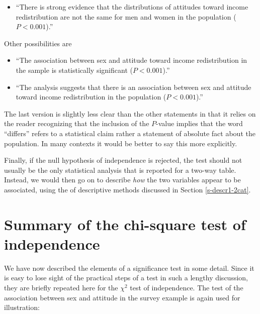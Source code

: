 \documentclass[11pt,a4paper,openany]{book}
\providecommand{\tightlist}{%
  \setlength{\itemsep}{0pt}\setlength{\parskip}{0pt}}
\begin{document}
\begin{itemize}
  \begin{itemize}
  \tightlist
  \item
    ``There is strong evidence that the distributions of attitudes
    toward income redistribution are not the same for men and women in
    the population (\(P<0.001\)).''
  \end{itemize}

  Other possibilities are

  \begin{itemize}
  \item
    ``The association between sex and attitude toward income
    redistribution in the sample is statistically significant
    (\(P<0.001\)).''
  \item
    ``The analysis suggests that there is an association between sex and
    attitude toward income redistribution in the population
    (\(P<0.001\)).''
  \end{itemize}

  The last version is slightly less clear than the other statements in
  that it relies on the reader recognizing that the inclusion of the
  \(P\)-value implies that the word ``differs'' refers to a statistical
  claim rather a statement of absolute fact about the population. In
  many contexts it would be better to say this more explicitly.
\end{itemize}

Finally, if the null hypothesis of independence is rejected, the test
should not usually be the only statistical analysis that is reported for
a two-way table. Instead, we would then go on to describe \emph{how} the
two variables appear to be associated, using the of descriptive methods
discussed in Section \ref{s-descr1-2cat}.

\section{Summary of the chi-square test of
independence}\label{s-tables-summary}

We have now described the elements of a significance test in some
detail. Since it is easy to lose sight of the practical steps of a test
in such a lengthy discussion, they are briefly repeated here for the
\(\chi^{2}\) test of independence. The test of the association between
sex and attitude in the survey example is again used for illustration:
\end{document}
